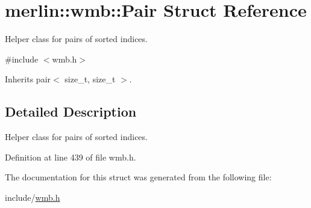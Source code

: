 \hypertarget{structmerlin_1_1wmb_1_1Pair}{}\section{merlin\+:\+:wmb\+:\+:Pair Struct Reference}
\label{structmerlin_1_1wmb_1_1Pair}


Helper class for pairs of sorted indices.  




{\ttfamily \#include $<$wmb.\+h$>$}



Inherits pair$<$ size\+\_\+t, size\+\_\+t $>$.



\subsection{Detailed Description}
Helper class for pairs of sorted indices. 

Definition at line 439 of file wmb.\+h.



The documentation for this struct was generated from the following file\+:\begin{DoxyCompactItemize}
\item 
include/\hyperlink{wmb_8h}{wmb.\+h}\end{DoxyCompactItemize}
